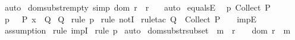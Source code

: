 \begin{isabellebody}
%
\isadelimproof
%
\endisadelimproof
%
\isatagproof
{}\isamarkupfalse%
\ auto\isanewline
{}\isamarkupfalse%
%
\endisatagproof
{\isafoldproof}%
%
\isadelimproof
\isanewline
%
\endisadelimproof
\isanewline
{}\isamarkupfalse%
\ dom{\isacharunderscore}substr{\isacharunderscore}empty\ {\isacharbrackleft}simp{\isacharbrackright}{\isacharcolon}\ {\isachardoublequoteopen}{\isacharparenleft}dom\ r\ {\isacharless}{\isacharminus}{\isacharcolon}\ r{\isacharparenright}\ {\isacharequal}\ {\isacharbraceleft}{\isacharbraceright}{\isachardoublequoteclose}\isanewline
%
\isadelimproof
%
\endisadelimproof
%
\isatagproof
{}\isamarkupfalse%
\ auto\isanewline
{}\isamarkupfalse%
%
\endisatagproof
{\isafoldproof}%
%
\isadelimproof
\isanewline
%
\endisadelimproof
\isanewline
\isanewline
{}\isamarkupfalse%
\ equals{}E{\isacharcolon}\ \isanewline
{}\ p{}{\isacharcolon}\ {\isachardoublequoteopen}Collect\ P\ {\isacharequal}\ {\isacharbraceleft}{\isacharbraceright}{\isachardoublequoteclose}\isanewline
{}\ p{}{\isacharcolon}\ \ {\isachardoublequoteopen}{\isachartilde}\ P\ x\ {\isacharequal}{\isacharequal}{\isachargreater}\ Q{\isachardoublequoteclose}\isanewline
{}\ {\isachardoublequoteopen}Q{\isachardoublequoteclose}\isanewline
%
\isadelimproof
%
\endisadelimproof
%
\isatagproof
{}\isamarkupfalse%
\ {\isacharparenleft}rule\ p{}{\isacharparenright}\isanewline
{}\isamarkupfalse%
\ {\isacharparenleft}rule\ notI{\isacharparenright}\isanewline
{}\isamarkupfalse%
\ {\isacharparenleft}rule{\isacharunderscore}tac\ Q\ {\isacharequal}\ {\isachardoublequoteopen}Collect\ P\ {\isacharequal}\ {\isacharbraceleft}{\isacharbraceright}{\isachardoublequoteclose}\ \ impE{\isacharparenright}\isanewline
{}\isamarkupfalse%
\ {}\isanewline
{}\isamarkupfalse%
\ {\isacharparenleft}assumption{\isacharparenright}\isanewline
{}\isamarkupfalse%
\ {\isacharparenleft}rule\ impI{\isacharparenright}\isanewline
{}\isamarkupfalse%
\ {\isacharparenleft}rule\ p{}{\isacharparenright}\isanewline
{}\isamarkupfalse%
\ auto\isanewline
{}\isamarkupfalse%
%
\endisatagproof
{\isafoldproof}%
%
\isadelimproof
\isanewline
%
\endisadelimproof
\isanewline
\isanewline
{}\isamarkupfalse%
\ dom{\isacharunderscore}substr{\isacharunderscore}subset\ {\isacharcolon}\ {\isachardoublequoteopen}{\isacharparenleft}{\isacharparenleft}m\ {\isacharless}{\isacharminus}{\isacharcolon}\ r{\isacharparenright}\ {\isacharequal}\ {\isacharbraceleft}{\isacharbraceright}{\isacharparenright}\ {\isacharequal}\ {\isacharparenleft}{\isacharparenleft}dom\ r{\isacharparenright}\ {\isacharless}{\isacharequal}\ m{\isacharparenright}{\isachardoublequoteclose}\isanewline

\end{isabellebody}
